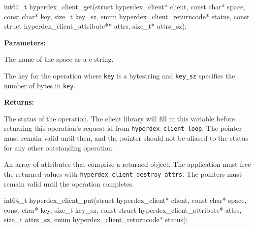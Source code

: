 
\begin{ccode}
int64_t hyperdex_client_get(struct hyperdex_client* client,
                const char* space,
                const char* key, size_t key_sz,
                enum hyperdex_client_returncode* status,
                const struct hyperdex_client_attribute** attrs, size_t* attrs_sz);
\end{ccode}
\funcdesc 

\noindent\textbf{Parameters:}
\begin{description}[labelindent=\widthof{{\texttt{key}, \texttt{key\_sz}}},leftmargin=*,noitemsep,nolistsep,align=right]
\item[\texttt{space}] The name of the space as a c-string.
\item[\texttt{key}, \texttt{key\_sz}] The key for the operation where \texttt{key} is a bytestring and \texttt{key\_sz} specifies the number of bytes in \texttt{key}.
\end{description}

\noindent\textbf{Returns:}
\begin{description}[labelindent=\widthof{{\texttt{attrs}, \texttt{attrs\_sz}}},leftmargin=*,noitemsep,nolistsep,align=right]
\item[\texttt{status}] The status of the operation.  The client library will fill in this variable before returning this operation's request id from \texttt{hyperdex\_client\_loop}.  The pointer must remain valid until then, and the pointer should not be aliased to the status for any other outstanding operation.
\item[\texttt{attrs}, \texttt{attrs\_sz}] An array of attributes that comprise a returned object.  The application must free the returned values with \texttt{hyperdex\_client\_destroy\_attrs}.  The pointers must remain valid until the operation completes.
\end{description}

\funcsep
{}
\begin{ccode}
int64_t hyperdex_client_put(struct hyperdex_client* client,
                const char* space,
                const char* key, size_t key_sz,
                const struct hyperdex_client_attribute* attrs, size_t attrs_sz,
                enum hyperdex_client_returncode* status);
\end{ccode}
\funcdesc 

